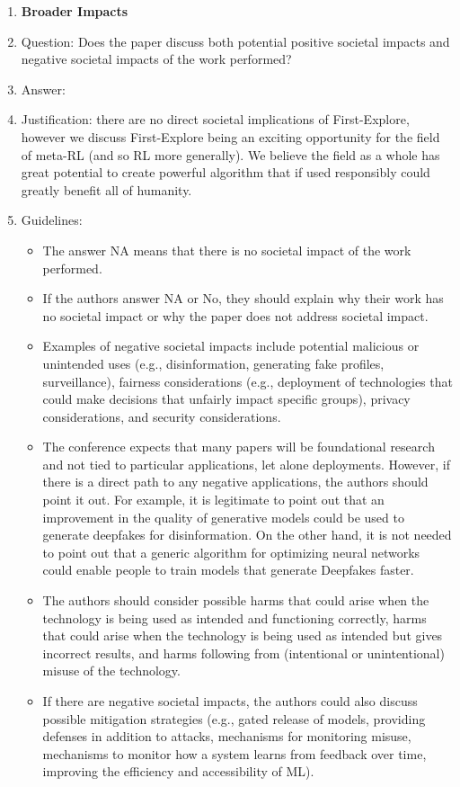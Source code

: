 \documentclass{article}
\begin{document}
\begin{enumerate}
\item {\bf Broader Impacts}
    \item[] Question: Does the paper discuss both potential positive societal impacts and negative societal impacts of the work performed?
    \item[] Answer: \answerNA{} %
    \item[] Justification: there are no direct societal implications of First-Explore, however we discuss First-Explore being an exciting opportunity for the field of meta-RL (and so RL more generally). We believe the field as a whole has great potential to create powerful algorithm that if used responsibly could greatly benefit all of humanity.
    \item[] Guidelines:
    \begin{itemize}
        \item The answer NA means that there is no societal impact of the work performed.
        \item If the authors answer NA or No, they should explain why their work has no societal impact or why the paper does not address societal impact.
        \item Examples of negative societal impacts include potential malicious or unintended uses (e.g., disinformation, generating fake profiles, surveillance), fairness considerations (e.g., deployment of technologies that could make decisions that unfairly impact specific groups), privacy considerations, and security considerations.
        \item The conference expects that many papers will be foundational research and not tied to particular applications, let alone deployments. However, if there is a direct path to any negative applications, the authors should point it out. For example, it is legitimate to point out that an improvement in the quality of generative models could be used to generate deepfakes for disinformation. On the other hand, it is not needed to point out that a generic algorithm for optimizing neural networks could enable people to train models that generate Deepfakes faster.
        \item The authors should consider possible harms that could arise when the technology is being used as intended and functioning correctly, harms that could arise when the technology is being used as intended but gives incorrect results, and harms following from (intentional or unintentional) misuse of the technology.
        \item If there are negative societal impacts, the authors could also discuss possible mitigation strategies (e.g., gated release of models, providing defenses in addition to attacks, mechanisms for monitoring misuse, mechanisms to monitor how a system learns from feedback over time, improving the efficiency and accessibility of ML).
    \end{itemize}
    

\end{enumerate}
\end{document}
